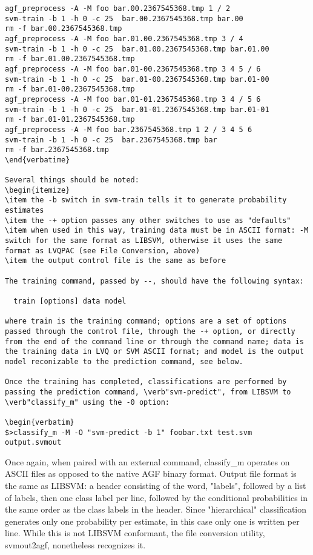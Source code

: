 \documentclass[12pt]{article}
\begin{document}
\begin{verbatim}
agf_preprocess -A -M foo bar.00.2367545368.tmp 1 / 2
svm-train -b 1 -h 0 -c 25  bar.00.2367545368.tmp bar.00
rm -f bar.00.2367545368.tmp
agf_preprocess -A -M foo bar.01.00.2367545368.tmp 3 / 4
svm-train -b 1 -h 0 -c 25  bar.01.00.2367545368.tmp bar.01.00
rm -f bar.01.00.2367545368.tmp
agf_preprocess -A -M foo bar.01-00.2367545368.tmp 3 4 5 / 6
svm-train -b 1 -h 0 -c 25  bar.01-00.2367545368.tmp bar.01-00
rm -f bar.01-00.2367545368.tmp
agf_preprocess -A -M foo bar.01-01.2367545368.tmp 3 4 / 5 6
svm-train -b 1 -h 0 -c 25  bar.01-01.2367545368.tmp bar.01-01
rm -f bar.01-01.2367545368.tmp
agf_preprocess -A -M foo bar.2367545368.tmp 1 2 / 3 4 5 6
svm-train -b 1 -h 0 -c 25  bar.2367545368.tmp bar
rm -f bar.2367545368.tmp
\end{verbatime}

Several things should be noted:
\begin{itemize}
\item the -b switch in svm-train tells it to generate probability estimates
\item the -+ option passes any other switches to use as "defaults"
\item when used in this way, training data must be in ASCII format: -M switch for the same format as LIBSVM, otherwise it uses the same format as LVQPAC (see File Conversion, above)
\item the output control file is the same as before

The training command, passed by --, should have the following syntax:

  train [options] data model

where train is the training command; options are a set of options passed through the control file, through the -+ option, or directly from the end of the command line or through the command name; data is the training data in LVQ or SVM ASCII format; and model is the output model reconizable to the prediction command, see below.

Once the training has completed, classifications are performed by passing the prediction command, \verb"svm-predict", from LIBSVM to \verb"classify_m" using the -0 option:

\begin{verbatim}
$>classify_m -M -O "svm-predict -b 1" foobar.txt test.svm output.svmout
\end{verbatim}

Once again, when paired with an external command, classify_m operates on ASCII files as opposed to the native AGF binary format. Output file format is the same as LIBSVM: a header consisting of the word, "labels", followed by a list of labels, then one class label per line, followed by the conditional probabilities in the same order as the class labels in the header. Since "hierarchical" classification generates only one probability per estimate, in this case only one is written per line.  While this is not LIBSVM conformant, the file conversion utility, svmout2agf, nonetheless recognizes it.  
\end{document}
